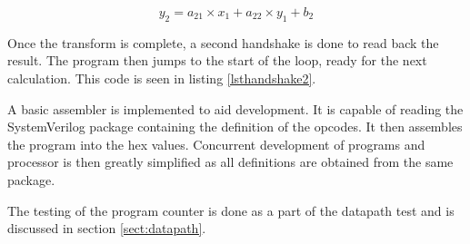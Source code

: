 \begin{equation}\label{eq:y2}
y_2 = a_{21} \times x_1 + a_{22} \times y_1 + b_2
\end{equation}





Once the transform is complete, a second handshake is done to read back the result. 
The program then jumps to the start of the loop, ready for the next calculation. 
This code is seen in listing \ref{lsthandshake2}.




A basic assembler is implemented to aid development.
It is capable of reading the SystemVerilog package containing the definition of the opcodes.
It then assembles the program into the hex values. 
Concurrent development of programs and processor is then greatly simplified as all definitions are obtained from the same package.


The testing of the program counter is done as a part of the datapath test and is discussed in section \ref{sect:datapath}.
